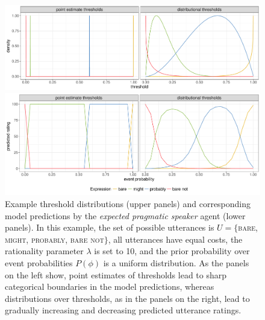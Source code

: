 \documentclass[man, floatsintext]{apa6}
\begin{document}
\begin{figure}[th!]
\includegraphics[width=\textwidth]{plots/model-visualization-distributions.pdf}

\includegraphics[width=\textwidth]{plots/model-visualization-predictions.pdf}

\caption{Example threshold distributions (upper panels) and corresponding model predictions by the \textit{expected pragmatic speaker} agent (lower panels). In this example, the set of possible utterances is $U=\{$\textsc{bare}, \textsc{might}, \textsc{probably}, \textsc{bare not}$\}$, all utterances have equal costs, the rationality parameter $\lambda$ is set to 10, and the prior probability over event probabilities $P(\phi)$ is a uniform distribution. As the panels on the left show, point estimates of thresholds lead to sharp categorical boundaries in the model predictions, whereas distributions over thresholds, as in the panels on the right, lead to gradually increasing and decreasing predicted utterance ratings. \label{fig:model-visualization}}
\end{figure}
\end{document}
